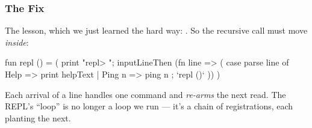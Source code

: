 \documentclass[aspectratio=169]{beamer}
\begin{document}
\begin{frame}[fragile]
  \frametitle{The Fix}

  The lesson, which we just learned the hard way: . So the
  recursive call must move \textit{inside}:

  \begin{codeblock}
    fun repl () =
      ( print "repl> ";
        inputLineThen (fn line =>
          ( case parse line of
              Help => print helpText
            | Ping n => ping n
          ; `repl ()` ))
      )
\end{codeblock}

  \pause
  \vspace{\fill}

  Each arrival of a line handles one command and \textit{re-arms} the
  next read. The REPL's ``loop'' is no longer a loop we run --- it's a
  chain of registrations, each planting the next.
\end{frame}












\end{document}
